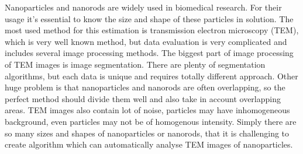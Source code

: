 \pagestyle{plain}

Nanoparticles and nanorods are widely used in biomedical research. For their usage it’s essential to know the size and shape of these particles in solution. The most used method for this estimation is transmission electron microscopy (TEM), which is very well known method, but data evaluation is very complicated and includes several image processing methods. The biggest part of image processing of TEM images is image segmentation. There are plenty of segmentation algorithms, but each data is unique and requires totally different approach. Other huge problem is that nanoparticles and nanorods are often overlapping, so the perfect method should divide them well and also take in account overlapping areas. TEM images also contain lot of noise, particles may have inhomogeneous background, even particles may not be of homogenous intensity. Simply there are so many sizes and shapes of nanoparticles or nanorods, that it is challenging to create algorithm which can automatically analyse TEM images of nanoparticles.